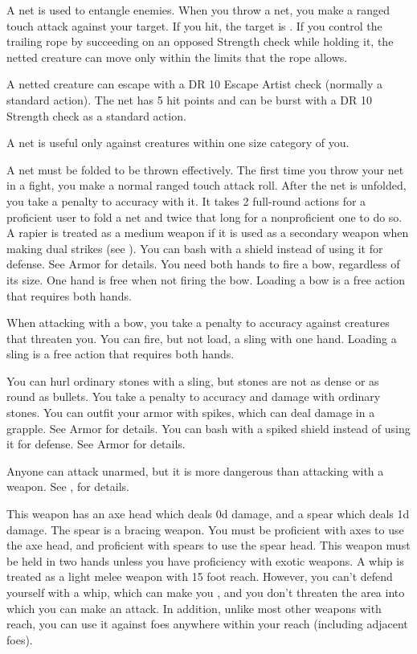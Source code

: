          A net is used to entangle enemies. When you throw a net, you make a ranged touch attack against your target. If you hit, the target is \slowed. If you control the trailing rope by succeeding on an opposed Strength check while holding it, the netted creature can move only within the limits that the rope allows.
        \par A netted creature can escape with a DR 10 Escape Artist check (normally a standard action). The net has 5 hit points and can be burst with a DR 10 Strength check as a standard action.
        \par A net is useful only against creatures within one size category of you.
        \par A net must be folded to be thrown effectively. The first time you throw your net in a fight, you make a normal ranged touch attack roll. After the net is unfolded, you take a  penalty to accuracy with it. It takes 2 full-round actions for a proficient user to fold a net and twice that long for a nonproficient one to do so.
         A rapier is treated as a medium weapon if it is used as a secondary weapon when making dual strikes (see ).
         You can bash with a shield instead of using it for defense. See Armor for details.
         You need both hands to fire a bow, regardless of its size. One hand is free when not firing the bow. Loading a bow is a free action that requires both hands.
        \par When attacking with a bow, you take a  penalty to accuracy against creatures that threaten you.
         You can fire, but not load, a sling with one hand. Loading a sling is a free action that requires both hands.
        \par You can hurl ordinary stones with a sling, but stones are not as dense or as round as bullets. You take a  penalty to accuracy and damage with ordinary stones.
         You can outfit your armor with spikes, which can deal damage in a grapple. See Armor for details.
         You can bash with a spiked shield instead of using it for defense. See Armor for details.

         Anyone can attack unarmed, but it is more dangerous than attacking with a weapon. See , for details.

         This weapon has an axe head which deals \plus0d damage, and a spear which deals \minus1d damage. The spear is a bracing weapon. You must be proficient with axes to use the axe head, and proficient with spears to use the spear head.
         This weapon must be held in two hands unless you have proficiency with exotic weapons.
         A whip is treated as a light melee weapon with 15 foot reach. However, you can't defend yourself with a whip, which can make you , and you don't threaten the area into which you can make an attack. In addition, unlike most other weapons with reach, you can use it against foes anywhere within your reach (including adjacent foes).

